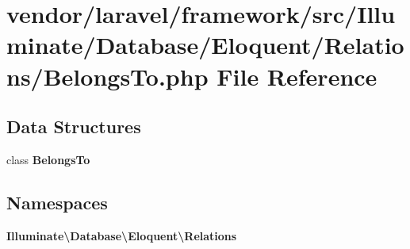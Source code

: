 \section{vendor/laravel/framework/src/\+Illuminate/\+Database/\+Eloquent/\+Relations/\+Belongs\+To.php File Reference}
\label{_belongs_to_8php}
\subsection*{Data Structures}
\begin{DoxyCompactItemize}
\item 
class {\bf Belongs\+To}
\end{DoxyCompactItemize}
\subsection*{Namespaces}
\begin{DoxyCompactItemize}
\item 
 {\bf Illuminate\textbackslash{}\+Database\textbackslash{}\+Eloquent\textbackslash{}\+Relations}
\end{DoxyCompactItemize}
